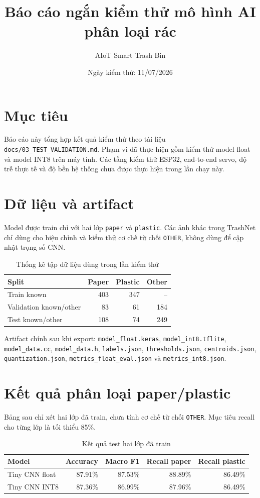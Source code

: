 \documentclass[12pt,a4paper]{article}
\title{\textbf{Báo cáo ngắn kiểm thử mô hình AI phân loại rác}}
\author{AIoT Smart Trash Bin}
\date{Ngày kiểm thử: 11/07/2026}
\begin{document}
\maketitle

\section{Mục tiêu}
Báo cáo này tổng hợp kết quả kiểm thử theo tài liệu
\texttt{docs/03\_TEST\_VALIDATION.md}. Phạm vi đã thực hiện gồm kiểm thử model
float và model INT8 trên máy tính. Các tầng kiểm thử ESP32, end-to-end servo,
độ trễ thực tế và độ bền hệ thống chưa được thực hiện trong lần chạy này.

\section{Dữ liệu và artifact}
Model được train chỉ với hai lớp \texttt{paper} và \texttt{plastic}. Các ảnh
khác trong TrashNet chỉ dùng cho hiệu chỉnh và kiểm thử cơ chế từ chối
\texttt{OTHER}, không dùng để cập nhật trọng số CNN.

\begin{table}[H]
\centering
\caption{Thống kê tập dữ liệu dùng trong lần kiểm thử}
\begin{tabular}{lrrr}
\toprule
\textbf{Split} & \textbf{Paper} & \textbf{Plastic} & \textbf{Other} \\
\midrule
Train known & 403 & 347 & -- \\
Validation known/other & 83 & 61 & 184 \\
Test known/other & 108 & 74 & 249 \\
\bottomrule
\end{tabular}
\end{table}

Artifact chính sau khi export:
\texttt{model\_float.keras},
\texttt{model\_int8.tflite},
\texttt{model\_data.cc},
\texttt{model\_data.h},
\texttt{labels.json},
\texttt{thresholds.json},
\texttt{centroids.json},
\texttt{quantization.json},
\texttt{metrics\_float\_eval.json} và
\texttt{metrics\_int8.json}.

\section{Kết quả phân loại paper/plastic}
Bảng sau chỉ xét hai lớp đã train, chưa tính cơ chế từ chối \texttt{OTHER}.
Mục tiêu recall cho từng lớp là tối thiểu 85\%.

\begin{table}[H]
\centering
\caption{Kết quả test hai lớp đã train}
\begin{tabular}{lrrrr}
\toprule
\textbf{Model} & \textbf{Accuracy} & \textbf{Macro F1} &
\textbf{Recall paper} & \textbf{Recall plastic} \\
\midrule
Tiny CNN float & 87.91\% & 87.53\% & 88.89\% & 86.49\% \\
Tiny CNN INT8 & 87.36\% & 86.99\% & 87.96\% & 86.49\% \\
\bottomrule
\end{tabular}
\end{table}
\end{document}
